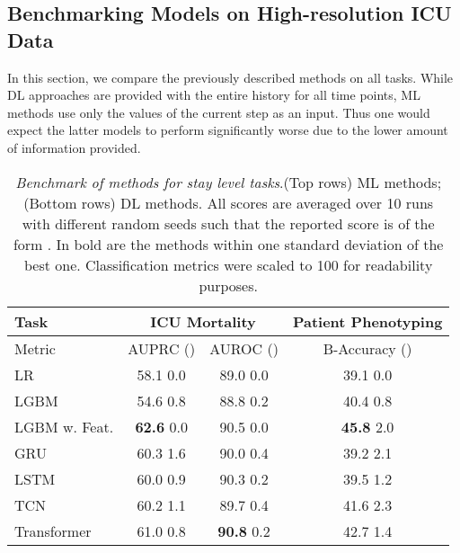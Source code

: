 \documentclass{article}
\begin{document}
\subsection{Benchmarking Models on High-resolution ICU Data}
In this section, we compare the previously described methods on all tasks. While DL approaches are provided with the entire history for all time points, ML methods use only the values of the current step as an input. Thus one would expect the latter models to perform significantly worse due to the lower amount of information provided.
\begin{table}[!ht]
    \footnotesize
    \centering
    \caption{\textit{Benchmark of methods for stay level tasks}.(Top rows) ML methods; (Bottom rows) DL methods. All scores are averaged over 10 runs with different random seeds such that the reported score is of the form . In bold are the methods within one standard deviation of the best one. Classification metrics were scaled to 100 for readability purposes.}
\begin{tabular}{l|cc|c}
\toprule
Task & \multicolumn{2}{c|}{ICU Mortality} &     Patient Phenotyping  \\
\midrule
Metric & AUPRC () & AUROC () & B-Accuracy () \\
\midrule
LR                 &     58.1  0.0 &     89.0  0.0 &          39.1  0.0\\
LGBM               &     54.6  0.8 &     88.8  0.2 &          40.4  0.8  \\
LGBM w. Feat.      &     \textbf{62.6}  0.0 &     90.5  0.0 &          \textbf{45.8}  2.0  \\
\midrule
\midrule
GRU                &     60.3  1.6 &     90.0  0.4 &          39.2  2.1 \\
LSTM               &     60.0  0.9 &     90.3  0.2 &          39.5  1.2  \\
TCN                &     60.2  1.1 &     89.7  0.4 &          41.6  2.3  \\
Transformer        &     61.0  0.8 &     \textbf{90.8}  0.2 &          42.7  1.4 \\
\bottomrule
\end{tabular}

    \label{tab:stay-level}
\end{table}
\end{document}
